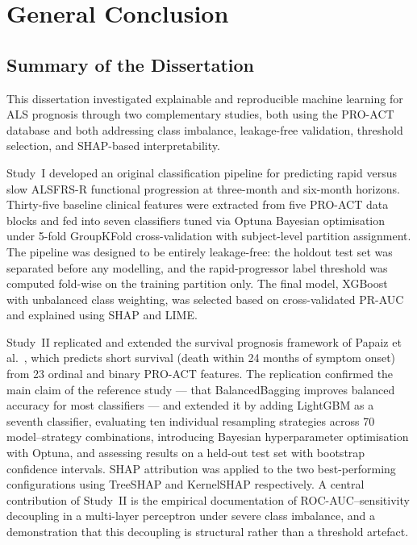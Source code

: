 \chapter{General Conclusion}
\label{ch:conclusion}

\section{Summary of the Dissertation}
\label{sec:conclusion_summary}

This dissertation investigated explainable and reproducible machine learning for \gls{ALS} prognosis through two complementary studies, both using the \gls{PRO-ACT} database and both addressing class imbalance, leakage-free validation, threshold selection, and \gls{SHAP}-based interpretability.

Study~I developed an original classification pipeline for predicting rapid versus slow \gls{ALSFRS-R} functional progression at three-month and six-month horizons. Thirty-five baseline clinical features were extracted from five \gls{PRO-ACT} data blocks and fed into seven classifiers tuned via Optuna Bayesian optimisation under 5-fold GroupKFold cross-validation with subject-level partition assignment. The pipeline was designed to be entirely leakage-free: the holdout test set was separated before any modelling, and the rapid-progressor label threshold was computed fold-wise on the training partition only. The final model, XGBoost with unbalanced class weighting, was selected based on cross-validated \gls{PR-AUC} and explained using \gls{SHAP} and \gls{LIME}.

Study~II replicated and extended the survival prognosis framework of Papaiz et al.\ \cite{Papaiz2024}, which predicts short survival (death within 24 months of symptom onset) from 23 ordinal and binary \gls{PRO-ACT} features. The replication confirmed the main claim of the reference study --- that BalancedBagging improves balanced accuracy for most classifiers --- and extended it by adding LightGBM as a seventh classifier, evaluating ten individual resampling strategies across 70 model--strategy combinations, introducing Bayesian hyperparameter optimisation with Optuna, and assessing results on a held-out test set with bootstrap confidence intervals. \gls{SHAP} attribution was applied to the two best-performing configurations using TreeSHAP and KernelSHAP respectively. A central contribution of Study~II is the empirical documentation of \gls{ROC-AUC}--sensitivity decoupling in a multi-layer perceptron under severe class imbalance, and a demonstration that this decoupling is structural rather than a threshold artefact.

